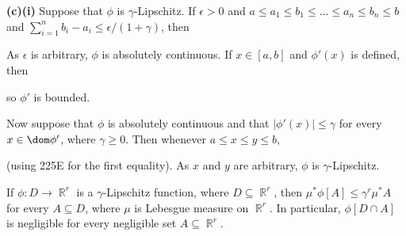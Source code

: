 {\medskip

{\bf (c)(i)} Suppose that $\phi$ is $\gamma$-Lipschitz.  If $\epsilon>0$
and
$a\le a_1\le b_1\le\ldots\le a_n\le b_n\le b$ and
$\sum_{i=1}^nb_i-a_i\le\epsilon/(1+\gamma)$, then


\noindent As $\epsilon$ is arbitrary, $\phi$ is absolutely continuous.
If $x\in[a,b]$ and $\phi'(x)$ is defined, then


\noindent so $\phi'$ is bounded.

\medskip

 Now suppose that $\phi$ is absolutely continuous and
that $|\phi'(x)|\le\gamma$ for every $x\in\dom\phi'$, where
$\gamma\ge 0$.   Then whenever $a\le x\le y\le b$,


\noindent (using 225E for the first equality).   As $x$ and $y$ are
arbitrary, $\phi$ is $\gamma$-Lipschitz.
}%


 If $\phi:D\to\BbbR^r$ is a $\gamma$-Lipschitz
function, where $D\subseteq\BbbR^r$, then
$\mu^*\phi[A]\le\gamma^r\mu^*A$ for every $A\subseteq D$, where $\mu$ is
Lebesgue measure on $\BbbR^r$.   In particular,
$\phi[D\cap A]$ is negligible for every negligible set $A\subseteq\BbbR^r$.

